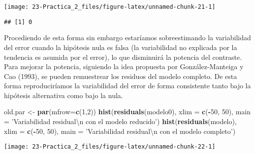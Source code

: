 \documentclass[
]{book}
\newenvironment{Shaded}{\begin{snugshade}}{\end{snugshade}}
\newcommand{\CharTok}[1]{\textcolor[rgb]{0.31,0.60,0.02}{#1}}
\newcommand{\CommentTok}[1]{\textcolor[rgb]{0.56,0.35,0.01}{\textit{#1}}}
\newcommand{\DataTypeTok}[1]{\textcolor[rgb]{0.13,0.29,0.53}{#1}}
\newcommand{\DecValTok}[1]{\textcolor[rgb]{0.00,0.00,0.81}{#1}}
\newcommand{\KeywordTok}[1]{\textcolor[rgb]{0.13,0.29,0.53}{\textbf{#1}}}
\newcommand{\NormalTok}[1]{#1}
\newcommand{\OperatorTok}[1]{\textcolor[rgb]{0.81,0.36,0.00}{\textbf{#1}}}
\newcommand{\StringTok}[1]{\textcolor[rgb]{0.31,0.60,0.02}{#1}}
\theoremstyle{definition}
\theoremstyle{definition}
\theoremstyle{definition}
\theoremstyle{remark}
\begin{document}
\begin{center}\texttt{[image: 23-Practica\_2\_files/figure-latex/unnamed-chunk-21-1]} \end{center}

\begin{Shaded}
\end{Shaded}

\begin{verbatim}
## [1] 0
\end{verbatim}

Procediendo de esta forma sin embargo estaríamos sobreestimando la variabilidad
del error cuando la hipótesis nula es falsa (la variabilidad no explicada por la
tendencia es asumida por el error), lo que disminuirá la potencia del contraste.
Para mejorar la potencia, siguiendo la idea propuesta por González-Manteiga
y Cao (1993), se pueden remuestrear los residuos del modelo completo.
De esta forma reproduciríamos la variabilidad del error de forma consistente
tanto bajo la hipótesis alternativa como bajo la nula.

\begin{Shaded}
\begin{Highlighting}[]
\NormalTok{old.par <-}\StringTok{ }\KeywordTok{par}\NormalTok{(}\DataTypeTok{mfrow=}\KeywordTok{c}\NormalTok{(}\DecValTok{1}\NormalTok{,}\DecValTok{2}\NormalTok{))}
\KeywordTok{hist}\NormalTok{(}\KeywordTok{residuals}\NormalTok{(modelo0), }\DataTypeTok{xlim =} \KeywordTok{c}\NormalTok{(}\OperatorTok{-}\DecValTok{50}\NormalTok{, }\DecValTok{50}\NormalTok{), }
     \DataTypeTok{main =} \StringTok{'Variabilidad residual}\CharTok{\textbackslash{}n}\StringTok{ con el modelo reducido'}\NormalTok{)}
\KeywordTok{hist}\NormalTok{(}\KeywordTok{residuals}\NormalTok{(modelo), }\DataTypeTok{xlim =} \KeywordTok{c}\NormalTok{(}\OperatorTok{-}\DecValTok{50}\NormalTok{, }\DecValTok{50}\NormalTok{), }
     \DataTypeTok{main =} \StringTok{'Variabilidad residual}\CharTok{\textbackslash{}n}\StringTok{ con el modelo completo'}\NormalTok{)}
\end{Highlighting}
\end{Shaded}

\begin{center}\texttt{[image: 23-Practica\_2\_files/figure-latex/unnamed-chunk-22-1]} \end{center}
\end{document}
